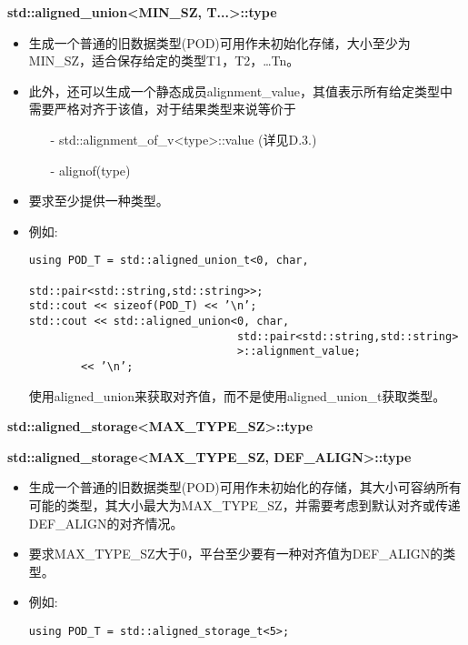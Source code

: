 \textbf{std::aligned\_union<MIN\_SZ, T...>::type}

\begin{itemize}
\item
生成一个普通的旧数据类型(POD)可用作未初始化存储，大小至少为MIN\_SZ，适合保存给定的类型T1，T2，…Tn。

\item
此外，还可以生成一个静态成员alignment\_value，其值表示所有给定类型中需要严格对齐于该值，对于结果类型来说等价于

\begin{itemize}
\item[-]
std::alignment\_of\_v<type>::value (详见D.3.)

\item[-]
alignof(type)
\end{itemize}

\item
要求至少提供一种类型。

\item
例如:
\begin{lstlisting}[style=styleCXX]
using POD_T = std::aligned_union_t<0, char,
								std::pair<std::string,std::string>>;
std::cout << sizeof(POD_T) << ’\n’;
std::cout << std::aligned_union<0, char,
								std::pair<std::string,std::string>
								>::alignment_value;
		<< ’\n’;
\end{lstlisting}

使用aligned\_union来获取对齐值，而不是使用aligned\_union\_t获取类型。
\end{itemize}

\textbf{std::aligned\_storage<MAX\_TYPE\_SZ>::type}

\textbf{std::aligned\_storage<MAX\_TYPE\_SZ, DEF\_ALIGN>::type}

\begin{itemize}
\item
生成一个普通的旧数据类型(POD)可用作未初始化的存储，其大小可容纳所有可能的类型，其大小最大为MAX\_TYPE\_SZ，并需要考虑到默认对齐或传递DEF\_ALIGN的对齐情况。

\item
要求MAX\_TYPE\_SZ大于0，平台至少要有一种对齐值为DEF\_ALIGN的类型。

\item
例如:
\begin{lstlisting}[style=styleCXX]
using POD_T = std::aligned_storage_t<5>;
\end{lstlisting}
\end{itemize}













